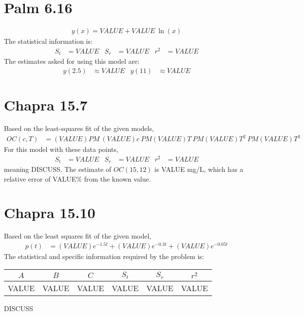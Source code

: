 \documentclass{article}
\begin{document}
\section{Palm 6.16}
\begin{align*}
y(x) = VALUE+VALUE~\ln(x)
\end{align*}
The statistical information is:
\begin{align*}
S_t&=VALUE & S_r &= VALUE & r^2 &=VALUE
\end{align*}
The estimates asked for using this model are:
\begin{align*}
y(2.5)&\approx VALUE & y(11)&\approx VALUE
\end{align*}

\section{Chapra 15.7}
Based on the least-squares fit of the given models,
\begin{align*}
OC(c,T)&=(VALUE)PM~(VALUE)c~PM(VALUE)T~PM(VALUE)T^2~PM(VALUE)T^3
\end{align*}
For this model with these data points, 
\begin{align*}
S_t &= VALUE &
S_r &= VALUE &
r^2 &= VALUE
\end{align*}
meaning DISCUSS.  The estimate of $OC(15,12)$ is VALUE mg/L, which has a
relative error of VALUE\% from the known value.

\section{Chapra 15.10}
Based on the least squares fit of the given model,
\begin{align*}
p(t)&=(VALUE)e^{-1.5t} + (VALUE)e^{-0.3t}+(VALUE)e^{-0.05t}
\end{align*}
The statistical and specific information required by the problem is:
\begin{center}
\begin{tabular}{|c|c|c|c|c|c|}\hline
$A$ & $B$ & $C$ & $S_t$ & $S_r$ & $r^2$\\ \hline
VALUE & VALUE & VALUE & VALUE & VALUE & VALUE \\ \hline
\end{tabular}
\end{center}
DISCUSS
\end{document}
